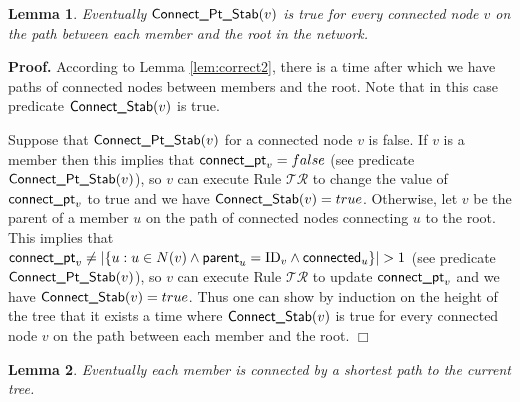\documentclass[11pt]{article}
\newtheorem{lemma}{Lemma}
\newenvironment{proof}{\noindent \begin{rm}{\textbf{Proof.} }}{\hspace*{\fill}$\Box$\par\end{rm} \vspace{.3cm}}
\newcommand{\id}{\mbox{ID}}
\newcommand{\parent}{\mbox{\sf parent}}
\newcommand{\connect}{\mbox{\sf connected}}
\newcommand{\connectpt}{\mbox{\sf connect\_pt}}
\newcommand{\ConnectS}{\mbox{\sf Connect\_Stab}}
\newcommand{\ConnectPtS}{\mbox{\sf Connect\_Pt\_Stab}}
\newcommand{\CRF}{$\mathcal{TR}$}
\begin{document}
\begin{lemma}
\label{lem:correct3}
Eventually $\ConnectPtS(v)$ is true for every connected node $v$ on the path between each member and the root in the network.
\end{lemma}

\begin{proof}
According to Lemma \ref{lem:correct2}, there is a time after which we have paths of connected nodes between members and the root. Note that in this case predicate $\ConnectS(v)$ is true.

Suppose that $\ConnectPtS(v)$ for a connected node $v$ is false. If $v$ is a member then this implies that $\connectpt_v = false$ (see predicate $\ConnectPtS(v)$), so $v$ can execute Rule \CRF\/ to change the value of $\connectpt_v$ to true and we have $\ConnectS(v)=true$. Otherwise, let $v$ be the parent of a member $u$ on the path of connected nodes connecting $u$ to the root. This implies that $\connectpt_v \neq |\{u:u\in N(v) \wedge \parent_u = \id_v \wedge \connect_u\}|>1$ (see predicate $\ConnectPtS(v)$), so $v$ can execute Rule \CRF\/ to update $\connectpt_v$ and we have $\ConnectS(v)=true$. Thus one can show by induction on the height of the tree that it exists a time where $\ConnectS(v)$ is true for every connected node $v$ on the path between each member and the root.
\end{proof}

\begin{lemma}
\label{lem:correct4}
Eventually each member is connected by a shortest path to the current tree.
\end{lemma}
\end{document}
